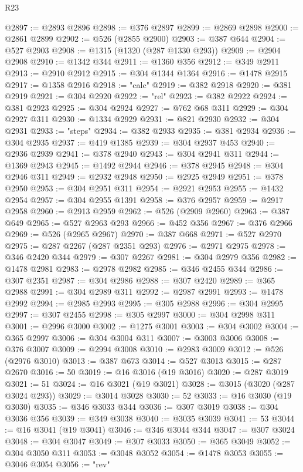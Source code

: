 \begin{lexlean}{R23}
\begin{coremodule}
@2897 := @2893 @2896
@2898 := @376 @2897
@2899 := @2869 @2898
@2900 := @2861 @2899
@2902 := @526 (@2855 @2900)
@2903 := @387 @644
@2904 := @527 @2903
@2908 := @1315 (@1320 (@287 @1330 @293))
@2909 := @2904 @2908
@2910 := @1342 @344
@2911 := @1360 @356
@2912 := @349 @2911
@2913 := @2910 @2912
@2915 := @304 @1344 @1364
@2916 := @1478 @2915
@2917 := @1358 @2916
@2918 := "calc"
@2919 := @382 @2918
@2920 := @381 @2919
@2921 := @304 @2920
@2922 := "rel"
@2923 := @382 @2922
@2924 := @381 @2923
@2925 := @304 @2924
@2927 := @762 @68 @311
@2929 := @304 @2927 @311
@2930 := @1334 @2929
@2931 := @821 @2930
@2932 := @304 @2931
@2933 := "steps"
@2934 := @382 @2933
@2935 := @381 @2934
@2936 := @304 @2935
@2937 := @419 @1385
@2939 := @304 @2937 @453
@2940 := @2936 @2939
@2941 := @378 @2940
@2943 := @304 @2941 @311
@2944 := @1369 @2943
@2945 := @1492 @2944
@2946 := @378 @2945
@2948 := @304 @2946 @311
@2949 := @2932 @2948
@2950 := @2925 @2949
@2951 := @378 @2950
@2953 := @304 @2951 @311
@2954 := @2921 @2953
@2955 := @1432 @2954
@2957 := @304 @2955 @1391
@2958 := @376 @2957
@2959 := @2917 @2958
@2960 := @2913 @2959
@2962 := @526 (@2909 @2960)
@2963 := @387 @649
@2965 := @527 @2963 @293
@2966 := @452 @356
@2967 := @376 @2966
@2969 := @526 (@2965 @2967)
@2970 := @387 @668
@2971 := @527 @2970
@2975 := @287 @2267 (@287 @2351 @293)
@2976 := @2971 @2975
@2978 := @346 @2420 @344
@2979 := @307 @2267
@2981 := @304 @2979 @356
@2982 := @1478 @2981
@2983 := @2978 @2982
@2985 := @346 @2455 @344
@2986 := @307 @2351
@2987 := @304 @2986
@2988 := @307 @2420
@2989 := @365 @2988
@2991 := @304 @2989 @311
@2992 := @2987 @2991
@2993 := @1478 @2992
@2994 := @2985 @2993
@2995 := @305 @2988
@2996 := @304 @2995
@2997 := @307 @2455
@2998 := @305 @2997
@3000 := @304 @2998 @311
@3001 := @2996 @3000
@3002 := @1275 @3001
@3003 := @304 @3002
@3004 := @365 @2997
@3006 := @304 @3004 @311
@3007 := @3003 @3006
@3008 := @376 @3007
@3009 := @2994 @3008
@3010 := @2983 @3009
@3012 := @526 (@2976 @3010)
@3013 := @387 @673
@3014 := @527 @3013
@3015 := @287 @2670
@3016 := 50
@3019 := @16 @3016 (@19 @3016)
@3020 := @287 @3019
@3021 := 51
@3024 := @16 @3021 (@19 @3021)
@3028 := @3015 (@3020 (@287 @3024 @293))
@3029 := @3014 @3028
@3030 := 52
@3033 := @16 @3030 (@19 @3030)
@3035 := @346 @3033 @344
@3036 := @307 @3019
@3038 := @304 @3036 @356
@3039 := @349 @3038
@3040 := @3035 @3039
@3041 := 53
@3044 := @16 @3041 (@19 @3041)
@3046 := @346 @3044 @344
@3047 := @307 @3024
@3048 := @304 @3047
@3049 := @307 @3033
@3050 := @365 @3049
@3052 := @304 @3050 @311
@3053 := @3048 @3052
@3054 := @1478 @3053
@3055 := @3046 @3054
@3056 := "rev"

\end{coremodule}
\end{lexlean}
